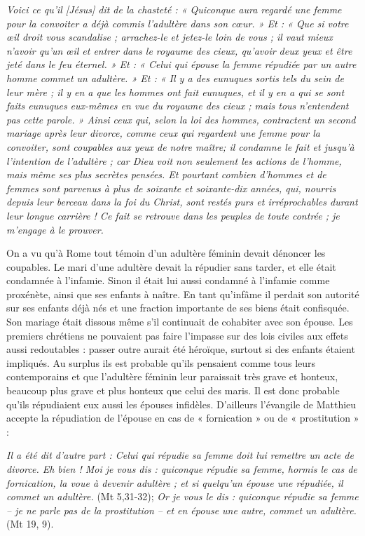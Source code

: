 \begin{displayquote}
\emph{Voici ce qu'il \emph{[Jésus]} dit de la chasteté : « Quiconque aura regardé une femme pour la convoiter a déjà commis l'adultère dans son cœur. » Et : « Que si votre œil droit vous scandalise ; arrachez-le et jetez-le loin de vous ; il vaut mieux n'avoir qu'un œil et entrer dans le royaume des cieux, qu'avoir deux yeux et être jeté dans le feu éternel. » Et : « Celui qui épouse la femme répudiée par un autre homme commet un adultère. » Et : « Il y a des eunuques sortis tels du sein de leur mère ; il y en a que les hommes ont fait eunuques, et il y en a qui se sont faits eunuques eux-mêmes en vue du royaume des cieux ; mais tous n'entendent pas cette parole. » Ainsi ceux qui, selon la loi des hommes, contractent un second mariage après leur divorce, comme ceux qui regardent une femme pour la convoiter, sont coupables aux yeux de notre maître; il condamne le fait et jusqu'à l'intention de l'adultère ; car Dieu voit non seulement les actions de l'homme, mais même ses plus secrètes pensées. Et pourtant combien d'hommes et de femmes sont parvenus à plus de soixante et soixante-dix années, qui, nourris depuis leur berceau dans la foi du Christ, sont restés purs et irréprochables durant leur longue carrière ! Ce fait se retrouve dans les peuples de toute contrée ; je m'engage à le prouver.}
\end{displayquote}
 
 On a vu qu'à Rome tout témoin d'un adultère féminin devait dénoncer les coupables. Le mari d'une adultère devait la répudier sans tarder, et elle était condamnée à l'infamie. Sinon il était lui aussi condamné à l'infamie comme proxénète, ainsi que ses enfants à naître. En tant qu'infâme il perdait son autorité sur ses enfants déjà nés et une fraction importante de ses biens était confisquée. Son mariage était dissous même s'il continuait de cohabiter avec son épouse. Les premiers chrétiens ne pouvaient pas faire l'impasse sur des lois civiles aux effets aussi redoutables : passer outre aurait été héroïque, surtout si des enfants étaient impliqués. Au surplus ils est probable qu'ils pensaient comme tous leurs contemporains et que l'adultère féminin leur paraissait très grave et honteux, beaucoup plus grave et plus honteux que celui des maris. Il est donc probable qu'ils répudiaient eux aussi les épouses infidèles. D'ailleurs l'évangile de Matthieu accepte la répudiation de l'épouse en cas de « fornication » ou de « prostitution » : 
 \begin{displayquote}
 \emph{Il a été dit d'autre part : Celui qui répudie sa femme doit lui remettre un acte de divorce. Eh bien ! Moi je vous dis : quiconque répudie sa femme, hormis le cas de fornication, la voue à devenir adultère ; et si quelqu'un épouse une répudiée, il commet un adultère.} (Mt 5,31-32); \emph{Or je vous le dis : quiconque répudie sa femme -- je ne parle pas de la prostitution -- et en épouse une autre, commet un adultère.} (Mt 19, 9).
 \end{displayquote}

